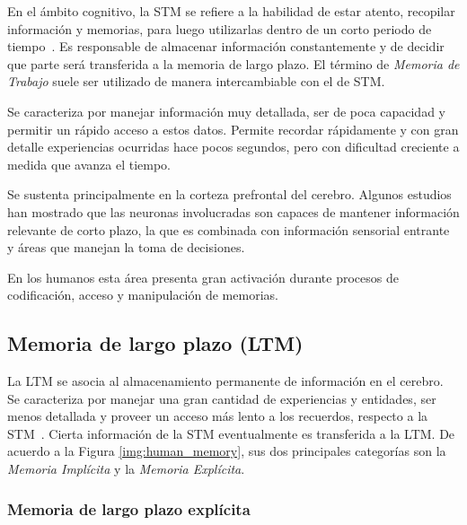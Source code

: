 En el ámbito cognitivo, la STM se refiere a la habilidad de estar atento, recopilar información  y memorias, para luego utilizarlas dentro de un corto periodo de tiempo~\cite{Eichenbaum:2008}. Es responsable de almacenar información constantemente y de decidir que parte será transferida a la memoria de largo plazo. El término de \textit{Memoria de Trabajo} suele ser utilizado de manera intercambiable con el de STM.

Se caracteriza por manejar información muy detallada, ser de poca capacidad y permitir un rápido acceso a estos datos. Permite recordar rápidamente y con gran detalle experiencias ocurridas hace pocos segundos, pero con dificultad creciente a medida que avanza el tiempo.

Se sustenta principalmente en la corteza prefrontal del cerebro. Algunos estudios han mostrado que las neuronas involucradas son capaces de mantener información relevante de corto plazo, la que es combinada con información sensorial entrante y áreas que manejan la toma de decisiones. 

En los humanos esta área presenta gran activación durante procesos de codificación, acceso y manipulación de memorias.


\subsection{Memoria de largo plazo (LTM)}


La LTM se asocia al almacenamiento permanente de información en el cerebro. Se caracteriza por manejar una gran cantidad de experiencias y entidades, ser menos detallada y proveer un acceso más lento a los recuerdos, respecto a la STM~\cite{Eichenbaum:2008}. Cierta información de la STM eventualmente es transferida a la LTM. De acuerdo a la Figura \ref{img:human_memory}, sus dos principales categorías son la \textit{Memoria Implícita} y la \textit{Memoria Explícita}.


\subsubsection{Memoria de largo plazo explícita}

